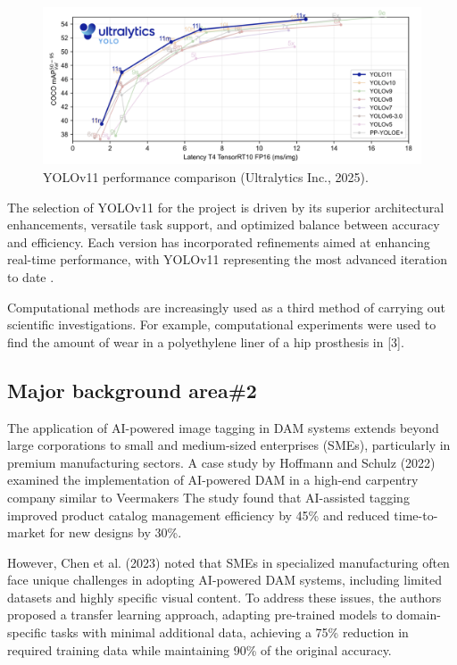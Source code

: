 \documentclass[a4paper,10pt,twocolumn]{article}
\numberwithin{figure}{section}
\numberwithin{table}{section}
\begin{document}
\begin{figure}[h]
    \centering
    \includegraphics[width=1\linewidth]{YOLOV11.png}  %
    \caption{YOLOv11 performance comparison (Ultralytics Inc., 2025).}
    \label{fig:bench}  
\end{figure}

The selection of YOLOv11 for the project is driven by its superior architectural 
enhancements, versatile task support, and optimized balance between accuracy and 
efficiency. 
  Each version has incorporated refinements aimed at enhancing real-time performance, 
  with YOLOv11 representing the most advanced iteration to date \citep{khanam2024yolov11overviewkeyarchitectural}.
\vspace{0.3cm}

Computational methods are increasingly used as a third method of carrying out scientific
investigations. For example, computational experiments were used to find the amount of wear in a
polyethylene liner of a hip prosthesis in [3].

\subsection{Major background area\#2}
The application of AI-powered image tagging in DAM systems extends beyond large corporations 
to small and medium-sized enterprises (SMEs), particularly in premium manufacturing sectors. A case study 
by Hoffmann and Schulz (2022) examined the implementation of AI-powered DAM in a high-end carpentry 
company similar to Veermakers
The study found that AI-assisted tagging improved product catalog management 
efficiency by 45\% and reduced time-to-market for new designs by 30\%.

However, Chen et al. (2023) noted that SMEs in specialized manufacturing often 
face unique challenges in adopting AI-powered DAM systems, including limited datasets 
and highly specific visual content. 
To address these issues, the authors proposed a transfer learning approach, adapting pre-trained 
models to domain-specific tasks with minimal additional data, achieving a 75\% reduction in required 
training data while maintaining 90\% of the original accuracy.
\end{document}
